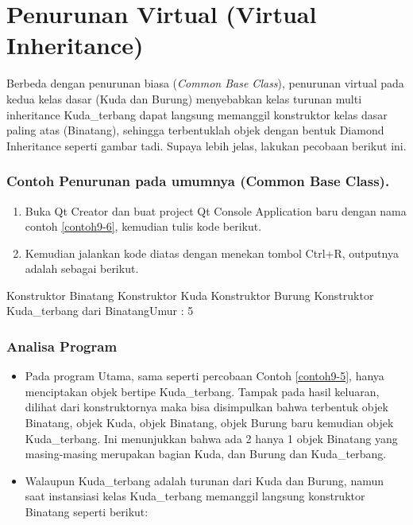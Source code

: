 \section{Penurunan Virtual (Virtual
Inheritance)}\label{penurunan-virtual-virtual-inheritance}

Berbeda dengan penurunan biasa (\emph{Common Base Class}), penurunan
virtual pada kedua kelas dasar (Kuda dan Burung) menyebabkan kelas
turunan multi inheritance Kuda\_terbang dapat langsung memanggil
konstruktor kelas dasar paling atas (Binatang), sehingga terbentuklah
objek dengan bentuk Diamond Inheritance seperti gambar tadi. Supaya
lebih jelas, lakukan pecobaan berikut ini.

\subsubsection*{Contoh  Penurunan pada umumnya (Common Base Class).}

\begin{enumerate}

\item
  Buka Qt Creator dan buat project Qt Console Application baru dengan
  nama contoh \ref{contoh9-6}, kemudian tulis kode berikut.




\item
  Kemudian jalankan kode diatas dengan menekan tombol Ctrl+R, outputnya
  adalah sebagai berikut.
\end{enumerate}
\begin{lcverbatim}
Konstruktor Binatang
Konstruktor Kuda 
Konstruktor Burung
Konstruktor Kuda_terbang dari
BinatangUmur : 5
\end{lcverbatim}


\subsubsection*{Analisa Program}

\begin{itemize}
\item
  Pada program Utama, sama seperti percobaan Contoh \ref{contoh9-5}, hanya menciptakan
  objek bertipe Kuda\_terbang. Tampak pada hasil keluaran, dilihat dari
  konstruktornya maka bisa disimpulkan bahwa terbentuk objek Binatang,
  objek Kuda, objek Binatang, objek Burung baru kemudian objek
  Kuda\_terbang. Ini menunjukkan bahwa ada 2 hanya 1 objek Binatang yang
  masing-masing merupakan bagian Kuda, dan Burung dan Kuda\_terbang.
\item
  Walaupun Kuda\_terbang adalah turunan dari Kuda dan Burung, namun saat
  instansiasi kelas Kuda\_terbang memanggil langsung konstruktor
  Binatang seperti berikut:


\end{itemize}


